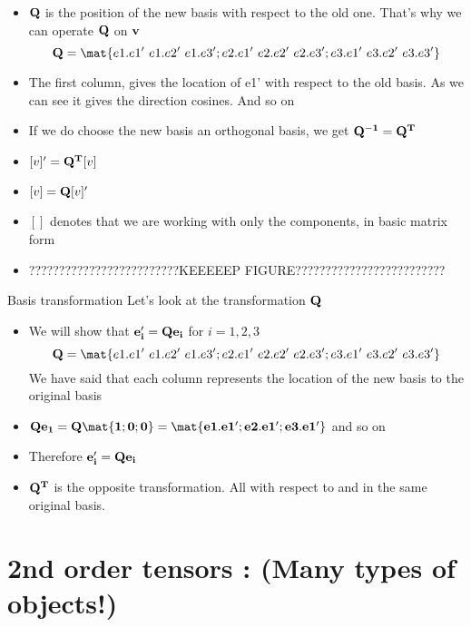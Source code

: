 	\begin{frame}
		\begin{itemize}
			\item $\mathbf{Q}$ is the position of the new basis with respect to the old one. That's why we can operate $\mathbf{Q}$ on $\mathbf{v}$
			\begin{equation}
				\ve{Q} = \mat{e1.e1'~e1.e2'~e1.e3';e2.e1'~e2.e2'~e2.e3';e3.e1'~e3.e2'~e3.e3'}
			\end{equation}
			\item The first column, gives the location of e1' with respect to the old basis. As we can see it gives the direction cosines. And so on
			\item If we do choose the new basis an orthogonal basis, we get $\mathbf{Q^{-1} = Q^T}$
			\item $[v]' = \mathbf{Q^T}[v]$
			\item $[v] = \mathbf{Q}[v]'$
			\item $[]$ denotes that we are working with only the components, in basic matrix form
			\item ?????????????????????????KEEEEEP FIGURE?????????????????????????
		\end{itemize}
	\end{frame}


	\begin{frame}{Basis transformation}
		Let's look at the transformation $\mathbf{Q}$
		
		\begin{itemize}
			\item We will show that  $\mathbf{e_i' = Q e_i}$ for $i=1,2,3$
			\begin{equation}
			\ve{Q} = \mat{e1.e1'~e1.e2'~e1.e3';e2.e1'~e2.e2'~e2.e3';e3.e1'~e3.e2'~e3.e3'}
			\end{equation}
			We have said that each column represents the location of the new basis to the original basis
			
			\item $\ve{Qe_1 = Q\mat{1;0;0} = \mat{e1.e1';e2.e1';e3.e1'}}$ and so on
			\item Therefore $\mathbf{e_i' = Q e_i}$
			\item $\mathbf{Q^T}$ is the opposite transformation. All with respect to and in the same original basis. 
		\end{itemize}
	\end{frame}

\section{2nd order tensors : (Many types of objects!)}

